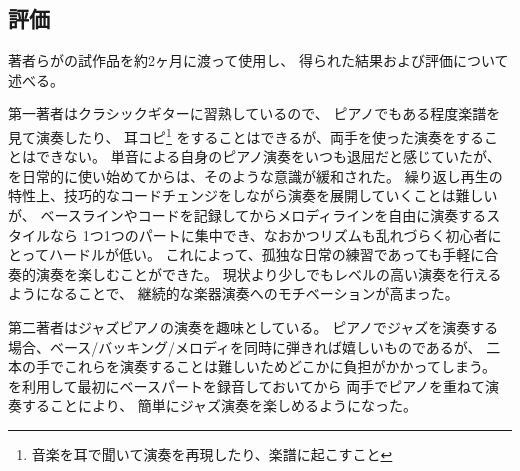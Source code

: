 \subsection{評価}

著者らが{\system}の試作品を約2ヶ月に渡って使用し、
得られた結果および評価について述べる。

第一著者はクラシックギターに習熟しているので、
ピアノでもある程度楽譜を見て演奏したり、
耳コピ\footnote{\textsf{音楽を耳で聞いて演奏を再現したり、楽譜に起こすこと}}
をすることはできるが、両手を使った演奏をすることはできない。
単音による自身のピアノ演奏をいつも退屈だと感じていたが、
{\system}を日常的に使い始めてからは、そのような意識が緩和された。
繰り返し再生の特性上、技巧的なコードチェンジをしながら演奏を展開していくことは難しいが、
ベースラインやコードを記録してからメロディラインを自由に演奏するスタイルなら
1つ1つのパートに集中でき、なおかつリズムも乱れづらく初心者にとってハードルが低い。
これによって、孤独な日常の練習であっても手軽に合奏的演奏を楽しむことができた。
現状より少しでもレベルの高い演奏を行えるようになることで、
継続的な楽器演奏へのモチベーションが高まった。

第二著者はジャズピアノの演奏を趣味としている。
ピアノでジャズを演奏する場合、ベース/バッキング/メロディを同時に弾きれば嬉しいものであるが、
二本の手でこれらを演奏することは難しいためどこかに負担がかかってしまう。
{\system}を利用して最初にベースパートを録音しておいてから
両手でピアノを重ねて演奏することにより、
簡単にジャズ演奏を楽しめるようになった。
